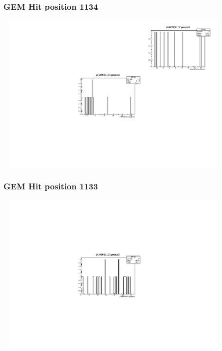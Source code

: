 \documentclass[slidestop,compress,mathserif]{beamer}
\begin{document}
\begin{frame}\frametitle{GEM Hit position 1134}
	 \includegraphics[width=12cm,height=8cm]{GEM_Hit_position_1134.pdf}
\end{frame}
\begin{frame}\frametitle{GEM Hit position 1133}
	 \includegraphics[width=12cm,height=8cm]{GEM_Hit_position_1133.pdf}
\end{frame}
\end{document}
